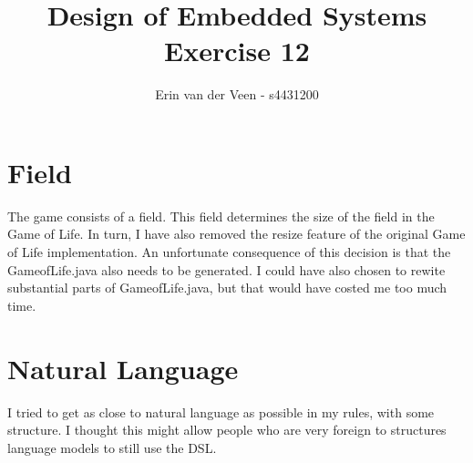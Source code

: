 \documentclass{scrartcl}
\title{Design of Embedded Systems\\Exercise 12}
\author{Erin van der Veen - s4431200}
\begin{document}
\maketitle

\section{Field}
The game consists of a field.
This field determines the size of the field in the Game of Life.
In turn, I have also removed the resize feature of the original Game of Life implementation.
An unfortunate consequence of this decision is that the GameofLife.java also needs to be generated.
I could have also chosen to rewite substantial parts of GameofLife.java, but that would have costed me too much time.

\section{Natural Language}
I tried to get as close to natural language as possible in my rules, with some structure.
I thought this might allow people who are very foreign to structures language models to still use the DSL.
\end{document}
